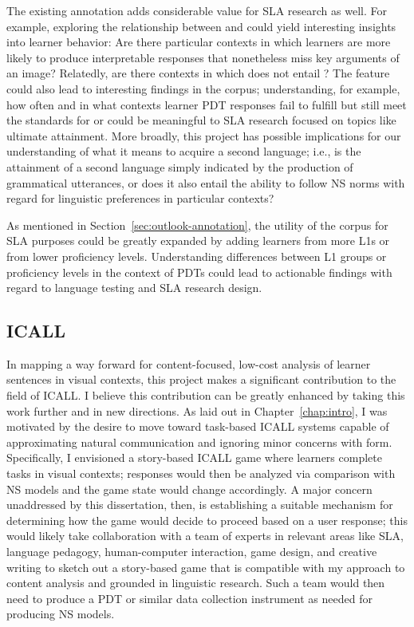 The existing annotation adds considerable value for SLA research as well. For example, exploring the relationship between  and  could yield interesting insights into learner behavior: Are there particular contexts in which learners are more likely to produce interpretable responses that nonetheless miss key arguments of an image? Relatedly, are there contexts in which  does not entail ? The  feature could also lead to interesting findings in the corpus; understanding, for example, how often and in what contexts learner PDT responses fail to fulfill  but still meet the standards for  or  could be meaningful to SLA research focused on topics like ultimate attainment. More broadly, this project has possible implications for our understanding of what it means to acquire a second language; i.e., is the attainment of a second language simply indicated by the production of grammatical utterances, or does it also entail the ability to follow NS norms with regard for linguistic preferences in particular contexts?

As mentioned in Section~\ref{sec:outlook-annotation}, the utility of the corpus for SLA purposes could be greatly expanded by adding learners from more L1s or from lower proficiency levels. Understanding differences between L1 groups or proficiency levels in the context of PDTs could lead to actionable findings with regard to language testing and SLA research design.

\subsection{ICALL}
\label{sec:outlook-icall}

In mapping a way forward for content-focused, low-cost analysis of learner sentences in visual contexts, this project makes a significant contribution to the field of ICALL. I believe this contribution can be greatly enhanced by taking this work further and in new directions. As laid out in Chapter~\ref{chap:intro}, I was motivated by the desire to move toward task-based ICALL systems capable of approximating natural communication and ignoring minor concerns with form. Specifically, I envisioned a story-based ICALL game where learners complete tasks in visual contexts; responses would then be analyzed via comparison with NS models and the game state would change accordingly. A major concern unaddressed by this dissertation, then, is establishing a suitable mechanism for determining how the game would decide to proceed based on a user response; this would likely take collaboration with a team of experts in relevant areas like SLA, language pedagogy, human-computer interaction, game design, and creative writing to sketch out a story-based game that is compatible with my approach to content analysis and grounded in linguistic research. Such a team would then need to produce a PDT or similar data collection instrument as needed for producing NS models.

